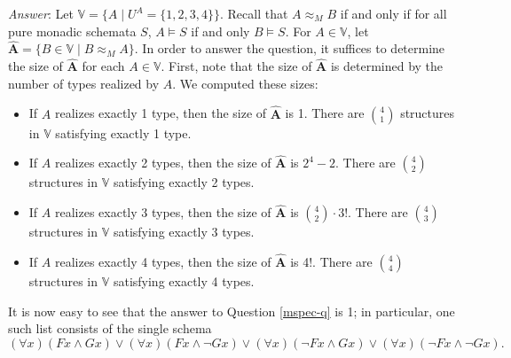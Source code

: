 \emph{Answer}:
Let $\mathbb{V} = \{A\mid U^A=\{1,2,3,4\}\}$. Recall that $A\approx_M B$ if and only if for all pure monadic schemata $S$, $A\models S$ if and only $B\models S$. For $A\in \mathbb{V}$, let $\bm\hat{A}=\{B\in \mathbb{V}\mid B\approx_M A\}$. In order to answer the question, it suffices to determine the size of $\bm\hat{A}$ for each $A\in\mathbb{V}$. First, note that the size of $\bm\hat{A}$ is determined by the number of types realized by $A$. We computed these sizes:
\begin{itemize}
\item
If $A$ realizes exactly 1 type, then the size of $\bm\hat{A}$ is 1. There are $\binom{4}{1}$ structures in $\mathbb{V}$ satisfying exactly 1 type.
\item
If $A$ realizes exactly 2 types, then the size of $\bm\hat{A}$ is $2^4-2$. There are $\binom{4}{2}$ structures in $\mathbb{V}$ satisfying exactly 2 types.
\item
If $A$ realizes exactly 3 types, then the size of $\bm\hat{A}$ is $\binom{4}{2}\cdot3!$. There are $\binom{4}{3}$ structures in $\mathbb{V}$ satisfying exactly 3 types.
\item
If $A$ realizes exactly 4 types, then the size of $\bm\hat{A}$ is 4!. There are $\binom{4}{4}$ structures in $\mathbb{V}$ satisfying exactly 4 types.
\end{itemize}
It is now easy to see that the answer to Question \ref{mspec-q} is 1; in particular, one such list consists of the single schema
\[(\forall x)(Fx\wedge Gx)\vee(\forall x)(Fx\wedge \neg Gx)\vee(\forall x)(\neg Fx\wedge Gx)\vee(\forall x)(\neg Fx\wedge \neg Gx).\]

